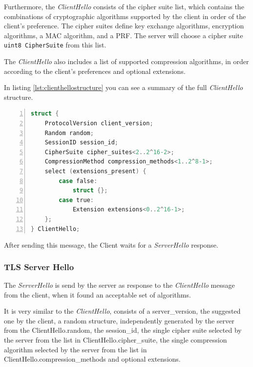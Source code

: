\documentclass[sigconf, screen]{acmart}
\begin{document}
Furthermore, the \textit{ClientHello} consists of the cipher suite list, which contains the combinations of cryptographic algorithms supported by the client in order of the client's preference. The cipher suites define key exchange algorithms, encryption algorithms, a MAC algorithm, and a PRF. The server will choose a cipher suite \lstinline[language=C]{uint8 CipherSuite} from this list. 

The \textit{ClientHello} also includes a list of supported compression algorithms, in order according to the client's preferences and optional extensions.

In listing \ref{lst:clienthellostructure} you can see a summary of the full \textit{ClientHello} structure.
\begin{lstlisting}[language=C,  tabsize=4, numbers=left, xleftmargin=5.0ex, basicstyle=\footnotesize, breakatwhitespace=false, breaklines=true, frame=tb, caption=\textit{ClientHello} structure \cite{TLS_v1_2}., label=lst:clienthellostructure]
struct {
	ProtocolVersion client_version;
	Random random;
	SessionID session_id;
	CipherSuite cipher_suites<2..2^16-2>;
	CompressionMethod compression_methods<1..2^8-1>;
	select (extensions_present) {
		case false:
			struct {};
		case true:
			Extension extensions<0..2^16-1>;
	};
} ClientHello;
\end{lstlisting}

After sending this message, the Client waits for a \textit{ServerHello} response.
\subsubsection{TLS Server Hello}
\label{sss:tlsserverhello}
The \textit{ServerHello} is send by the server as response to the \textit{ClientHello} message from the client, when it found an acceptable set of algorithms.

It is very similar to the \textit{ClientHello}, consists of a server\_version, the suggested one by the client, a random structure, independently generated by the server from the ClientHello.random, the session\_id, the single cipher suite selected by the server from the list in ClientHello.cipher\_suite, the single compression algorithm selected by the server from the list in ClientHello.compression\_methods and optional extensions.
\end{document}
